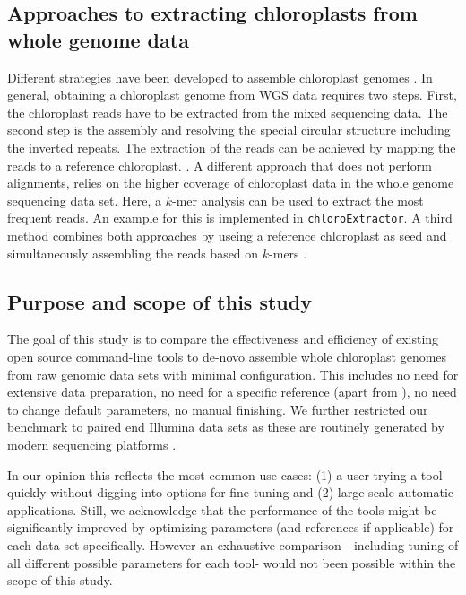 \documentclass{bmcart}
\newcounter{todocounter}
\newcommand{\ak}[1]
{\stepcounter{todocounter}
 \todo[color=green!40,author=Arthur]{\thetodocounter: #1}
 }
\newcommand{\formatprogramnames}[1]{\texttt{#1}}
\newcommand{\ce}{\formatprogramnames{chloroExtractor}}
\begin{document}
\subsection*{Approaches to extracting chloroplasts from whole genome data}

Different strategies have been developed to assemble chloroplast genomes \cite{twyford_strategies_2017}.
In general, obtaining a chloroplast genome from WGS data requires two steps. First, the chloroplast reads have to be extracted from the mixed sequencing data. 
The second step is the assembly and resolving the special circular structure including the inverted repeats.
The extraction of the reads can be achieved by mapping the reads to a reference chloroplast. \cite{Vinga2012}.
A different approach that does not perform alignments, relies on the higher coverage of chloroplast data in the whole genome sequencing data set\cite{Chan2013}. Here, a $k$-mer analysis can be used to extract the most frequent reads. An example for this is implemented in \ce{}.
A third method combines both approaches by useing a reference chloroplast as seed and simultaneously assembling the reads based on $k$-mers \cite{dierckxsens_novoplasty:_2017}.


\subsection*{Purpose and scope of this study}
The goal of this study is to compare the effectiveness and efficiency of existing open source command-line tools to de-novo assemble whole chloroplast genomes from raw genomic data sets with minimal configuration. 
This includes no need for extensive data preparation, no need for a specific reference (apart from ), no need to change default parameters, no manual finishing.
We further restricted our benchmark to paired end Illumina data sets as these are routinely generated by modern sequencing platforms \cite{Goodwin2016}. 

In our opinion this reflects the most common use cases: (1) a user trying a tool quickly without digging into options for fine tuning and (2) large scale automatic applications.
Still, we acknowledge that the performance of the tools might be significantly improved by optimizing parameters (and references if applicable) for each data set specifically. However an exhaustive comparison - including tuning of all different possible parameters for each tool- would not been possible within the scope of this study. 
\end{document}

